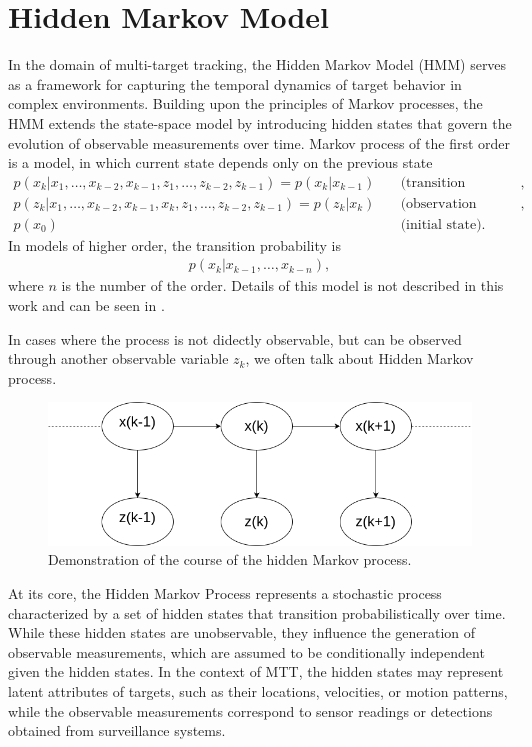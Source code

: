     \section{Hidden Markov Model}
In the domain of multi-target tracking, the Hidden Markov Model (HMM) serves as a framework for
capturing the temporal dynamics of target behavior in complex environments. Building upon the principles of Markov
processes, the HMM extends the state-space model by introducing hidden states that govern the evolution of observable
measurements over time. Markov process of the first order is a model, in which current state depends only on the
previous state
\begin{align}
    p(x_k|x_1,\dots,x_{k-2},x_{k-1}, z_1, \dots, z_{k-2}, z_{k-1}) = p(x_k|x_{k-1}) &\quad \text{(transition
    probability)}, \\
    p(z_k|x_1,\dots,x_{k-2},x_{k-1}, x_k, z_1, \dots, z_{k-2}, z_{k-1}) = p(z_k|x_{k}) &\quad \text{(observation
    likelihood)}, \\
    p(x_0)& \quad \text{(initial state)}.
\end{align}
In models of higher order, the transition probability is
\begin{align}
    p(x_k|x_{k-1},\dots,x_{k-n}),
\end{align}
where $n$ is the number of the order. Details of this model is not described in this work and can be seen in \cite{
    HadarHMMHigherOrder}.

In cases where the process is not didectly observable, but can be observed through another observable variable $z_k$,
we often talk about Hidden Markov process.
\begin{figure}[h]
    \centering
    \includegraphics[width=\linewidth]{./text/chapter_01/imgs/HMM}
    \caption{Demonstration of the course of the hidden Markov process.}
    \label{fig:hmm}
\end{figure}

At its core, the Hidden Markov Process represents a stochastic process characterized by a set of hidden states that transition probabilistically over time. While these hidden states are unobservable, they influence the generation of observable measurements, which are assumed to be conditionally independent given the hidden states. In the context of MTT, the hidden states may represent latent attributes of targets, such as their locations, velocities, or motion patterns, while the observable measurements correspond to sensor readings or detections obtained from surveillance systems.

